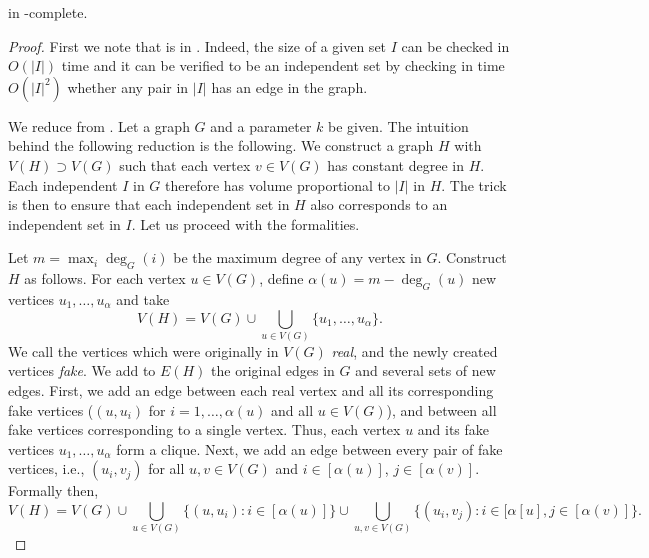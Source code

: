 \begin{lemma}
	\label{lem:vwis}
	\vwis in \NP-complete.
\end{lemma}
\begin{proof}
	First we note that \vwis is in \NP. Indeed, the size of a given set $I$  can be  checked  in  $O(|I|)$ time and it can be verified to be an independent set by checking in time $O(|I|^2)$ whether  any pair  in $|I|$ has an edge  in the  graph. 
	
	We  reduce from \iset.  Let a graph  $G$ and  a parameter $k$ be  given. The intuition behind  the following reduction is the following. We construct a  graph  $H$ with  $V(H)\supset  V(G)$ such that each vertex $v\in  V(G)$ has constant degree  in $H$.  Each independent $I$ in $G$ therefore has volume proportional to $|I|$ in $H$. The trick is then to ensure that each independent set in  $H$ also corresponds to an  independent set  in $I$. Let us proceed with the formalities. 
	
	Let $m=\max_i\deg_G(i)$  be the maximum degree of any vertex in $G$. Construct $H$ as follows. For each vertex $u\in V(G)$,  define  $\alpha(u)=m-\deg_G(u)$ new vertices  $u_1,\dots,u_\alpha$ and take \[V(H)=V(G)\cup \bigcup_{u\in V(G)} \{u_1,\dots,u_\alpha\}.\]  
	We call the vertices which  were originally in $V(G)$ \emph{real},  and the  newly created vertices \emph{fake}. We  add to $E(H)$ the original  edges in $G$ and several sets  of new  edges. First, we add an edge  between  each real  vertex and all its corresponding fake  vertices ($(u,u_i)$ for $i=1,\dots,\alpha(u)$  and all  $u\in V(G)$), and between all fake vertices  corresponding to a single  vertex. Thus,  each  vertex $u$ and  its  fake  vertices $u_1,\dots,u_\alpha$  form a clique. 
	Next, we add an  edge between  every  pair  of fake vertices, i.e., $(u_i,v_j)$ for  all $u,v\in V(G)$  and $i\in[\alpha(u)]$, $j\in[\alpha(v)]$. Formally then,  
	\begin{equation*}
	V(H) = V(G)	\cup\bigcup_{u\in V (G)}\{(u,u_i):i\in[\alpha(u)]\}\cup\bigcup_{u,v\in V(G)}\{(u_i,v_j):i\in[\alpha[u],j\in[\alpha(v)]\}.
	\end{equation*}
	

\end{proof}
